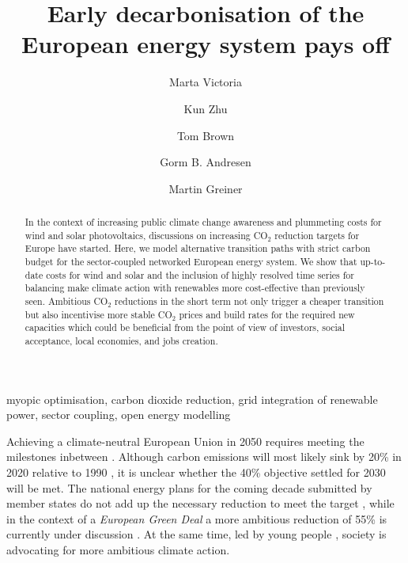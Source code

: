 \documentclass[5p]{elsarticle} %
\begin{document}
\begin{frontmatter}

\title{Early decarbonisation of the European energy system pays off}
\author[mymainaddress,iClimate]{Marta Victoria}
\author[mymainaddress]{Kun Zhu}
\author[kitaddress]{Tom Brown}
\author[mymainaddress,iClimate]{Gorm B. Andresen}
\author[mymainaddress,iClimate]{Martin Greiner}
\address[mymainaddress]{Department of Engineering, Aarhus University, Inge Lehmanns Gade 10, 8000 Aarhus, Denmark}
\address[iClimate]{iCLIMATE Interdisciplinary Centre for Climate Change, Aarhus University}
\address[kitaddress]{Institute for Automation and Applied Informatics (IAI), Karlsruhe Institute of Technology (KIT), Forschungszentrum 449, 76344, Eggenstein-Leopoldshafen, Germany}


\begin{abstract}

In the context of increasing public climate change awareness and plummeting costs for wind and solar photovoltaics, discussions on increasing CO$_2$ reduction targets for Europe have started. Here, we model alternative transition paths with strict carbon budget for the sector-coupled networked European energy system. We show that up-to-date costs for wind and solar and the inclusion of highly resolved time series for balancing make climate action with renewables more cost-effective than previously seen. Ambitious CO$_2$ reductions in the short term not only trigger a cheaper transition but also incentivise more stable CO$_2$ prices and build rates for the required new capacities which could be beneficial from the point of view of investors, social acceptance, local economies, and jobs creation.

\end{abstract}

\begin{keyword}
myopic optimisation, carbon dioxide reduction, grid integration of renewable power, sector coupling, open energy modelling
\end{keyword}

\end{frontmatter}

\linenumbers

Achieving a climate-neutral European Union in 2050 \cite{in-depth_2018} requires meeting the milestones inbetween . Although carbon emissions will most likely sink by 20\% in 2020 relative to 1990 \cite{EEA_totalGHG}, it is unclear whether the 40\% objective settled for 2030 will be met. The national energy plans for the coming decade submitted by member states do not add up the necessary reduction to meet the target \cite{EU-appraisal_2019}, while in the context of a \textit{European Green Deal} a more ambitious reduction of 55\% is currently under discussion \cite{GreenDeal}. At the same time, led by young people \cite{Warren_2019}, society is advocating for more ambitious climate action. \\ %
\end{document}
